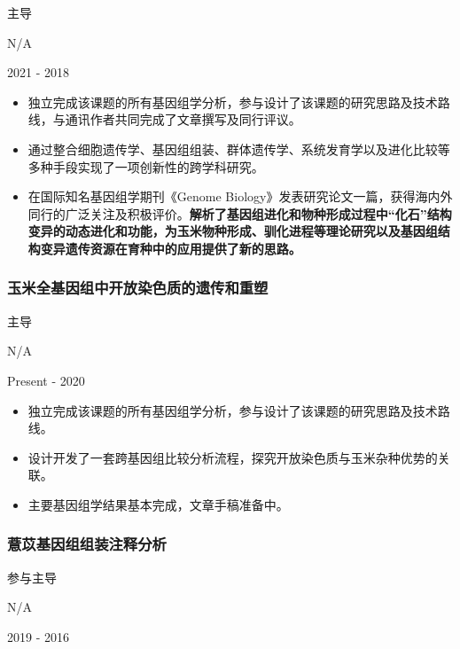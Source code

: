 \documentclass[]{article}
\providecommand{\tightlist}{%
  \setlength{\itemsep}{0pt}\setlength{\parskip}{0pt}}
\begin{document}
主导

N/A

2021 - 2018

\begin{itemize}
\tightlist
\item
  独立完成该课题的所有基因组学分析，参与设计了该课题的研究思路及技术路线，与通讯作者共同完成了文章撰写及同行评议。
\item
  通过整合细胞遗传学、基因组组装、群体遗传学、系统发育学以及进化比较等多种手段实现了一项创新性的跨学科研究。
\item
  在国际知名基因组学期刊《Genome
  Biology》发表研究论文一篇，获得海内外同行的广泛关注及积极评价。\textbf{解析了基因组进化和物种形成过程中``化石''结构变异的动态进化和功能，为玉米物种形成、驯化进程等理论研究以及基因组结构变异遗传资源在育种中的应用提供了新的思路。}
\end{itemize}

\hypertarget{ux7389ux7c73ux5168ux57faux56e0ux7ec4ux4e2dux5f00ux653eux67d3ux8272ux8d28ux7684ux9057ux4f20ux548cux91cdux5851}{%
\subsubsection{玉米全基因组中开放染色质的遗传和重塑}\label{ux7389ux7c73ux5168ux57faux56e0ux7ec4ux4e2dux5f00ux653eux67d3ux8272ux8d28ux7684ux9057ux4f20ux548cux91cdux5851}}

主导

N/A

Present - 2020

\begin{itemize}
\tightlist
\item
  独立完成该课题的所有基因组学分析，参与设计了该课题的研究思路及技术路线。
\item
  设计开发了一套跨基因组比较分析流程，探究开放染色质与玉米杂种优势的关联。
\item
  主要基因组学结果基本完成，文章手稿准备中。
\end{itemize}

\hypertarget{ux858fux82e1ux57faux56e0ux7ec4ux7ec4ux88c5ux6ce8ux91caux5206ux6790}{%
\subsubsection{薏苡基因组组装注释分析}\label{ux858fux82e1ux57faux56e0ux7ec4ux7ec4ux88c5ux6ce8ux91caux5206ux6790}}

参与主导

N/A

2019 - 2016
\end{document}
